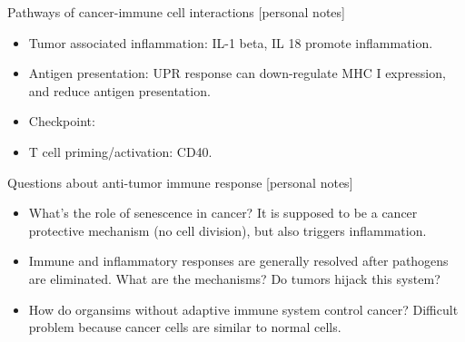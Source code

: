 \documentclass{report}
\begin{document}
Pathways of cancer-immune cell interactions [personal notes]
\begin{itemize}
	\item Tumor associated inflammation: IL-1 beta, IL 18 promote inflammation. 
	
	\item Antigen presentation: UPR response can down-regulate MHC I expression, and reduce antigen presentation. 
	
	\item Checkpoint:
	
	\item T cell priming/activation: CD40.  
\end{itemize}

Questions about anti-tumor immune response [personal notes] 
\begin{itemize}
	\item What's the role of senescence in cancer? It is supposed to be a cancer protective mechanism (no cell division), but also triggers inflammation. 
	
	\item Immune and inflammatory responses are generally resolved after pathogens are eliminated. What are the mechanisms? Do tumors hijack this system? 
	
	\item How do organsims without adaptive immune system control cancer? Difficult problem because cancer cells are similar to normal cells. 
\end{itemize}
\end{document}
